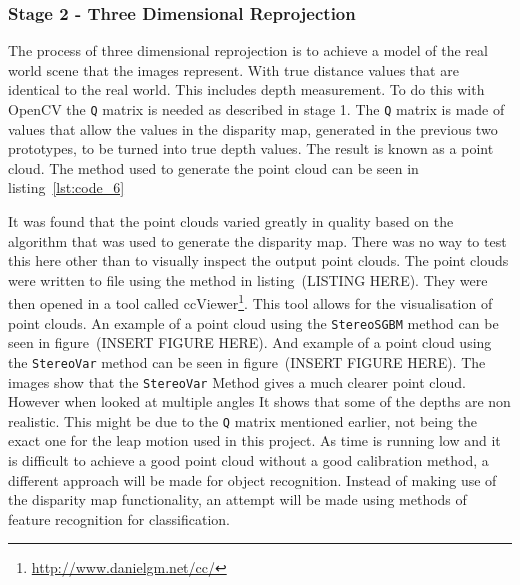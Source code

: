 \documentclass[11pt,oneside]{report}
\newcommand\code[1]{\texttt{#1}}
\begin{document}
		\subsubsection{Stage 2 - Three Dimensional Reprojection}
			The process of three dimensional reprojection is to achieve a model of the real world scene that the images represent. 
			With true distance values that are identical to the real world.
			This includes depth measurement.
			To do this with OpenCV the \code{Q} matrix is needed as described in stage 1.
			The \code{Q} matrix is made of values that allow the values in the disparity map, generated in the previous two prototypes, to be turned into true depth values.
			The result is known as a point cloud.
			The method used to generate the point cloud can be seen in listing~\ref{lst:code_6}
				
			It was found that the point clouds varied greatly in quality based on the algorithm that was used to generate the disparity map.
			There was no way to test this here other than to visually inspect the output point clouds.
			The point clouds were written to file using the method in listing~(LISTING HERE).
			They were then opened in a tool called ccViewer\footnote{\url{http://www.danielgm.net/cc/}}.
			This tool allows for the visualisation of point clouds.
			An example of a point cloud using the \code{StereoSGBM} method can be seen in figure~(INSERT FIGURE HERE).
			And example of a point cloud using the \code{StereoVar} method can be seen in figure~(INSERT FIGURE HERE).
			The images show that the \code{StereoVar} Method gives a much clearer point cloud.
			However when looked at multiple angles It shows that some of the depths are non realistic.
			This might be due to the \code{Q} matrix mentioned earlier, not being the exact one for the leap motion used in this project.
			As time is running low and it is difficult to achieve a good point cloud without a good calibration method, a different approach will be made for object recognition.
			Instead of making use of the disparity map functionality, an attempt will be made using methods of feature recognition for classification.
\end{document}
